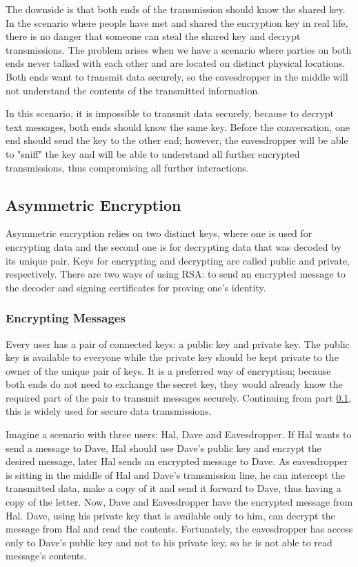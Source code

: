 \documentclass[a4paper, 12pt]{article}
\begin{document}
The downside is that both ends of the transmission should know the shared key. In the scenario where
people have met and shared the encryption key in real life, there is no danger that someone can
steal the shared key and decrypt transmissions. The problem arises when we have a scenario where
parties on both ends never talked with each other and are located on distinct physical locations.
Both ends want to transmit data securely, so the eavesdropper in the
middle will not understand the contents of the transmitted information.

In this scenario, it is
impossible to transmit data securely, because to decrypt text messages, both ends should know
the same key. Before the conversation, one end should send the key to the other end; however,
the eavesdropper will be able to "sniff" the key and will be able to understand all further encrypted
transmissions, thus compromising all further interactions.

\subsection{Asymmetric Encryption}
\label{bsec:asymmetric}

Asymmetric encryption relies on two distinct keys, where one is
used for encrypting data and the second one is for decrypting data that was decoded by its unique pair.
Keys for encrypting and decrypting are called public and private, respectively. There are two ways
of using RSA: to send an encrypted message to the decoder and signing certificates for
proving one's identity.

\subsubsection{Encrypting Messages}
\label{bbsec:encryption}

Every user has a pair of connected keys: a public key and private key. The public key is available
to everyone while the private key should be kept private to the owner of the unique pair
of keys. It is a preferred way of encryption; because both ends do not need to exchange the secret
key, they would already know the required part of the pair to transmit messages securely.
Continuing from part \ref{bsec:asymmetric}, this is widely used for secure data transmissions.

Imagine a scenario with three
users: Hal, Dave and Eavesdropper. If Hal wants to send a message to Dave, Hal should use Dave's
public key and encrypt the desired message, later Hal sends an encrypted message to Dave. As
eavesdropper is sitting in the middle of Hal and Dave's transmission line, he can intercept the
transmitted data, make a copy of it and send it forward to Dave, thus having a copy of the letter.
Now, Dave and Eavesdropper have the encrypted message from Hal. Dave, using his private key
that is available only to him, can decrypt the message from Hal and read the contents. Fortunately,
the eavesdropper has access only to Dave's public key and not to his private key, so he is not able to read
message's contents.
\end{document}
